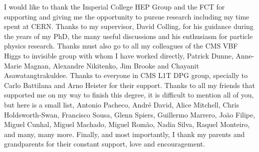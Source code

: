 \begin{acknowledgements}
I would like to thank the Imperial College HEP Group and the FCT for supporting and giving me the opportunity to pursue research including my time spent at CERN. Thanks to my supervisor, David Colling, for his guidance during the years of my PhD, the many useful discussions and his enthusiasm for particle physics research. Thanks must also go to all my colleagues of the CMS VBF Higgs to invisible group with whom I have worked directly, Patrick Dunne, Anne-Marie Magnan, Alexandre Nikitenko, Jim Brooke and Chayanit Asawatangtrakuldee. Thanks to everyone in CMS L1T DPG group, specially to Carlo Battilana and Arno Heister for their support. Thanks to all my friends that supported me on my way to finish this degree, it is difficult to mention all of you, but here is a small list, Antonio Pacheco, André David, Alice Mitchell, Chris Holdsworth-Swan, Francisco Sousa, Glenn Spiers, Guillermo Marrero, João Filipe, Miguel Cunhal, Miguel Machado, Miguel Romão, Nadia Silva, Raquel Monteiro, and many, many more. Finally, and most importantly, I thank my parents and grandparents for their constant support, love and encouragement.
\end{acknowledgements}




\dedication{To my grandmother.}


\tableofcontents

\newpage
\listoftables

\newpage
\listoffigures


 
